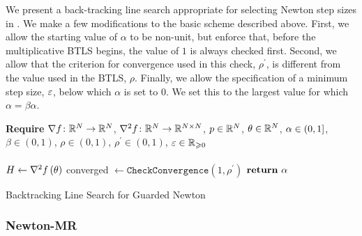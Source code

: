 \documentclass[../../thesis.tex]{subfiles}
\begin{document}
We present a back-tracking line search
appropriate for selecting Newton step sizes
in .
We make a few modifications to the basic scheme described above.
First, we allow the starting value of $\alpha$ to be non-unit,
but enforce that, before the multiplicative BTLS begins,
the value of $1$ is always checked first.
Second, we allow that
the criterion for convergence used in this check,
$\rho^\prime$,
is different from the value
used in the BTLS, $\rho$.
Finally,
we allow the specification of a minimum step size, $\varepsilon$,
below which $\alpha$ is set to $0$.
We set this to the largest value for which
$\alpha = \beta\alpha$.
\\
\begin{algorithm}[h]
    \SetAlgoLined{}
    \textbf{Require}
    $\nabla f\colon\mathbb{R}^N\to\mathbb{R}^N$,
    $\nabla^2 f\colon\mathbb{R}^N\to\mathbb{R}^{N\times N}$,
    $p \in \mathbb{R}^N$,
    $\theta \in \mathbb{R}^N$,
    $\alpha \in \intervaloc{0}{1}$,
    $\beta \in (0, 1)$,
    $\rho \in (0, 1)$,
    $\rho^\prime \in (0, 1)$,
    $\varepsilon \in \mathbb{R}_{\geqslant 0}$\\ \ \\
    \DontPrintSemicolon
    $H \leftarrow \nabla^2f\left(\theta\right)$\;
    \;
    converged $\leftarrow \texttt{CheckConvergence}\left(
    	1, \rho^\prime\right)$\;
    $\KwRet\ \alpha$%
    \caption{Backtracking Line Search for Guarded Newton}
\end{algorithm}

\subsubsection{Newton-MR}
\end{document}
